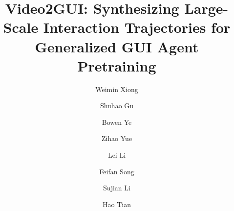 \documentclass{llmxive}
\title{Video2GUI: Synthesizing Large-Scale Interaction Trajectories for Generalized GUI Agent Pretraining}
\author{Weimin Xiong \and Shuhao Gu \and Bowen Ye \and Zihao Yue \and Lei Li \and Feifan Song \and Sujian Li \and Hao Tian}
\providecommand{\lilei}[1]{#1 -lilei}
\begin{document}
\maketitle
\begin{abstract}


\end{abstract}
\end{document}
